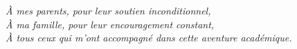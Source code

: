 
\thispagestyle{empty}
\vspace*{8cm}

\begin{center}
    \Large
    \textit{À mes parents, pour leur soutien inconditionnel,}\\
    \vspace{0.5cm}
    \textit{À ma famille, pour leur encouragement constant,}\\
    \vspace{0.5cm}
    \textit{À tous ceux qui m'ont accompagné dans cette aventure académique.}\\
\end{center}

\vfill

\cleardoublepage